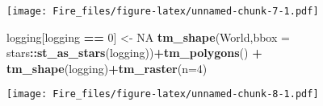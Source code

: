 \documentclass[
]{article}
\newenvironment{Shaded}{\begin{snugshade}}{\end{snugshade}}
\newcommand{\AttributeTok}[1]{\textcolor[rgb]{0.13,0.29,0.53}{#1}}
\newcommand{\ConstantTok}[1]{\textcolor[rgb]{0.56,0.35,0.01}{#1}}
\newcommand{\DecValTok}[1]{\textcolor[rgb]{0.00,0.00,0.81}{#1}}
\newcommand{\FunctionTok}[1]{\textcolor[rgb]{0.13,0.29,0.53}{\textbf{#1}}}
\newcommand{\NormalTok}[1]{#1}
\newcommand{\OtherTok}[1]{\textcolor[rgb]{0.56,0.35,0.01}{#1}}
\newcommand{\SpecialCharTok}[1]{\textcolor[rgb]{0.81,0.36,0.00}{\textbf{#1}}}
\begin{document}
\texttt{[image: Fire\_files/figure-latex/unnamed-chunk-7-1.pdf]}

\begin{Shaded}
\begin{Highlighting}[]
\NormalTok{logging[logging }\SpecialCharTok{==} \DecValTok{0}\NormalTok{] }\OtherTok{\textless{}{-}} \ConstantTok{NA}
\FunctionTok{tm\_shape}\NormalTok{(World,}\AttributeTok{bbox =}\NormalTok{ stars}\SpecialCharTok{::}\FunctionTok{st\_as\_stars}\NormalTok{(logging))}\SpecialCharTok{+}\FunctionTok{tm\_polygons}\NormalTok{() }\SpecialCharTok{+}
  \FunctionTok{tm\_shape}\NormalTok{(logging)}\SpecialCharTok{+}\FunctionTok{tm\_raster}\NormalTok{(}\AttributeTok{n=}\DecValTok{4}\NormalTok{)}
\end{Highlighting}
\end{Shaded}

\texttt{[image: Fire\_files/figure-latex/unnamed-chunk-8-1.pdf]}
\end{document}
